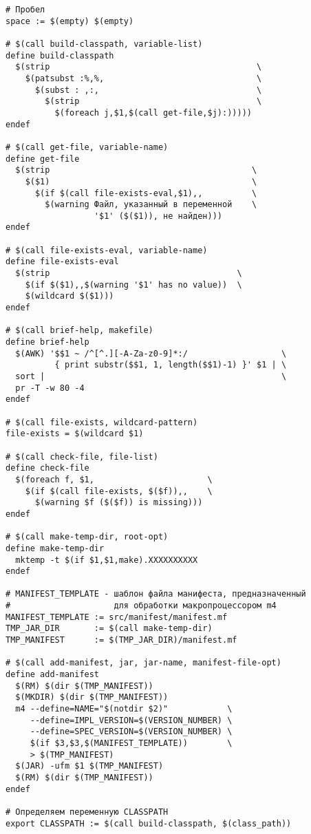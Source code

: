 {\begin{verbatim}
# Пробел
space := $(empty) $(empty)

# $(call build-classpath, variable-list)
define build-classpath
  $(strip                                          \
    $(patsubst :%,%,                               \
      $(subst : ,:,                                \
        $(strip                                    \
          $(foreach j,$1,$(call get-file,$j):)))))
endef

# $(call get-file, variable-name)
define get-file
  $(strip                                         \
    $($1)                                         \
      $(if $(call file-exists-eval,$1),,          \
        $(warning Файл, указанный в переменной    \
                  '$1' ($($1)), не найден)))
endef

# $(call file-exists-eval, variable-name)
define file-exists-eval
  $(strip                                      \
    $(if $($1),,$(warning '$1' has no value))  \
    $(wildcard $($1)))
endef

# $(call brief-help, makefile)
define brief-help
  $(AWK) '$$1 ~ /^[^.][-A-Za-z0-9]*:/                   \
          { print substr($$1, 1, length($$1)-1) }' $1 | \
  sort |                                                \
  pr -T -w 80 -4
endef

# $(call file-exists, wildcard-pattern)
file-exists = $(wildcard $1)

# $(call check-file, file-list)
define check-file
  $(foreach f, $1,                       \
    $(if $(call file-exists, $($f)),,    \
      $(warning $f ($($f)) is missing)))
endef

# $(call make-temp-dir, root-opt)
define make-temp-dir
  mktemp -t $(if $1,$1,make).XXXXXXXXXX
endef

# MANIFEST_TEMPLATE - шаблон файла манифеста, предназначенный
#                     для обработки макропроцессором m4
MANIFEST_TEMPLATE := src/manifest/manifest.mf
TMP_JAR_DIR       := $(call make-temp-dir)
TMP_MANIFEST      := $(TMP_JAR_DIR)/manifest.mf

# $(call add-manifest, jar, jar-name, manifest-file-opt)
define add-manifest
  $(RM) $(dir $(TMP_MANIFEST))
  $(MKDIR) $(dir $(TMP_MANIFEST))
  m4 --define=NAME="$(notdir $2)"            \
     --define=IMPL_VERSION=$(VERSION_NUMBER) \
     --define=SPEC_VERSION=$(VERSION_NUMBER) \
     $(if $3,$3,$(MANIFEST_TEMPLATE))        \
     > $(TMP_MANIFEST)
  $(JAR) -ufm $1 $(TMP_MANIFEST)
  $(RM) $(dir $(TMP_MANIFEST))
endef

# Определяем переменную CLASSPATH
export CLASSPATH := $(call build-classpath, $(class_path))


\end{verbatim}}
